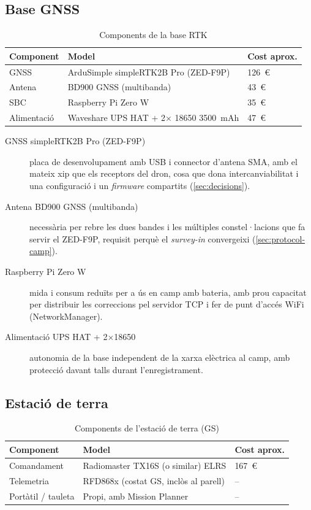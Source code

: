\subsection{Base GNSS}

\begin{table}[H]
    \centering
    \caption{Components de la base RTK}
    \label{tab:materials-base}
    \begin{tabular}{lll}
        \toprule
        Component & Model & Cost aprox. \\
        \midrule
        GNSS & ArduSimple simpleRTK2B Pro (ZED-F9P) & 126~€ \\
        Antena & BD900 GNSS (multibanda) & 43~€ \\
        SBC & Raspberry Pi Zero W & 35~€ \\
        Alimentació & Waveshare UPS HAT + 2$\times$ 18650 3500~mAh & 47~€ \\
        \bottomrule
    \end{tabular}
\end{table}

\begin{description}
    \item[GNSS simpleRTK2B Pro (ZED-F9P)] placa de desenvolupament amb USB i connector d'antena SMA, amb el mateix xip que els receptors del dron, cosa que dona intercanviabilitat i una configuració i un \emph{firmware} compartits (\cref{sec:decisions}).
    \item[Antena BD900 GNSS (multibanda)] necessària per rebre les dues bandes i les múltiples constel·lacions que fa servir el ZED-F9P, requisit perquè el \emph{survey-in} convergeixi (\cref{sec:protocol-camp}).
    \item[Raspberry Pi Zero W] mida i consum reduïts per a ús en camp amb bateria, amb prou capacitat per distribuir les correccions pel servidor TCP i fer de punt d'accés WiFi (NetworkManager).
    \item[Alimentació UPS HAT + 2$\times$18650] autonomia de la base independent de la xarxa elèctrica al camp, amb protecció davant talls durant l'enregistrament.
\end{description}

\subsection{Estació de terra}

\begin{table}[H]
    \centering
    \caption{Components de l'estació de terra (GS)}
    \label{tab:materials-gs}
    \begin{tabular}{lll}
        \toprule
        Component & Model & Cost aprox. \\
        \midrule
        Comandament & Radiomaster TX16S (o similar) ELRS & 167~€ \\
        Telemetria & RFD868x (costat GS, inclòs al parell) & -- \\
        Portàtil / tauleta & Propi, amb Mission Planner & -- \\
        \bottomrule
    \end{tabular}
\end{table}

